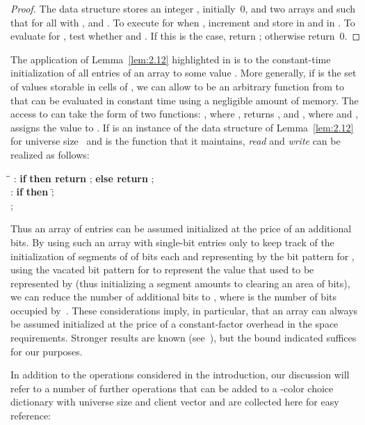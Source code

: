 \documentclass[envcountsame,envcountsect,undated,nolinenumbers]{lnthi}
\def\Tvn#1{\hbox{\textit{#1\/}}}
\begin{document}
\begin{proof}
The data structure stores an integer ,
initially~0, and two arrays
 and  such that
for all  with ,
 and .
To execute  for 
when , increment  and store  in  and
 in .
To evaluate  for , test whether
 and .
If this is the case, return ;
otherwise return~0.
\end{proof}

The application of
Lemma~\ref{lem:2.12}
highlighted in \cite[Exercise 2.12]{AhoHU74}
is to the constant-time initialization of all
entries of an array  to some
value .
More generally,
if  is the set of values storable in cells of ,
we can allow  to be an
arbitrary function from  to 
that can be evaluated in constant time using
a negligible amount of memory.
The access to  can take the form of two functions:
, where , returns ,
and , where  and ,
assigns the value  to .
If  is an instance of the data structure of
Lemma~\ref{lem:2.12} for universe size~
and  is the function that it maintains,
\Tvn{read} and \Tvn{write} can be realized as follows:

\begin{tabbing}
\quad\=\hskip 3cm\=\kill
\>:
\>\textbf{if}  \textbf{then return} ;
\textbf{else return} ;\\
\>:
\>\textbf{if}  \textbf{then} \=;\\
\>\>;
\end{tabbing}

Thus an array of  entries can be assumed initialized
at the price of an additional  bits.
By using such an array with single-bit entries
only to keep track of the
initialization of segments of  of  bits each and
representing  by the bit pattern 
for , using the vacated bit pattern
for  to represent the value that used
to be represented by  (thus initializing
a segment amounts to clearing an area of
 bits), we can reduce the number
of additional bits to ,
where  is the number of bits
occupied by~.
These considerations imply, in particular,
that an array can always
be assumed initialized at the price of a constant-factor
overhead in the space requirements.
Stronger results are known (see~\cite{FreK16}),
but the bound indicated
suffices for our purposes.


In addition to the operations considered in the
introduction, our discussion will refer to
a number of further operations that can be
added to a -color choice dictionary with
universe size  and client vector 
and are collected here for easy reference:
\end{document}
